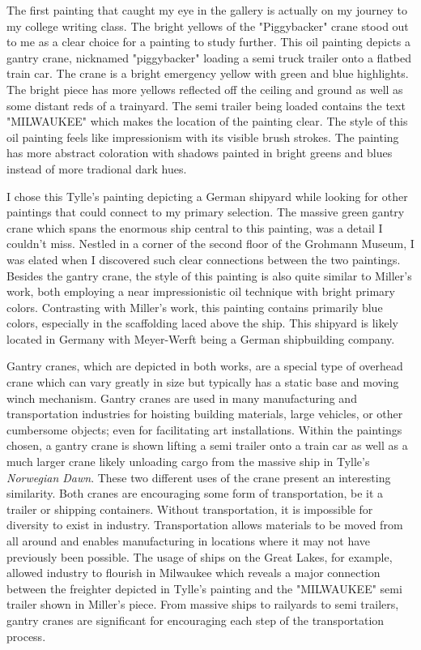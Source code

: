 \documentclass[12pt]{article}
\begin{document}
The first painting that caught my eye in the gallery is actually on my journey to my college writing class. The bright yellows of the 
"Piggybacker" crane stood out to me as a clear choice for a painting to study further.
This oil painting depicts a gantry crane, nicknamed "piggybacker" loading a semi truck trailer onto
a flatbed train car. The crane is a bright emergency yellow with green and blue highlights. The bright piece has more yellows reflected off the ceiling
and ground as well as some distant reds of a trainyard. The semi trailer being loaded contains the text "MILWAUKEE" which makes the location
of the painting clear. The style of this oil painting feels like impressionism with its visible brush strokes. The painting has more abstract coloration 
with shadows painted in bright greens and blues instead of more tradional dark hues.

I chose this Tylle's painting depicting a German shipyard
while looking for other paintings that could connect to my primary selection. The massive green gantry crane which spans the enormous
ship central to this painting, was a detail I couldn't miss. Nestled in a corner of the second floor of the Grohmann Museum, I was elated when I discovered
such clear connections between the two paintings. 
Besides the gantry crane, the style of this painting is also quite similar to Miller's work, both employing a 
near impressionistic oil technique with bright primary colors. Contrasting with Miller's work, this painting contains primarily blue colors, especially in
the scaffolding laced above the ship. This shipyard is likely located in Germany with Meyer-Werft being a German shipbuilding company.

Gantry cranes, which are depicted in both works, are a special type of overhead crane which can vary greatly 
in size but typically has a static base and moving winch mechanism.
Gantry cranes are used in many manufacturing and transportation industries for hoisting building materials, large vehicles, or other cumbersome
objects; even for facilitating art installations. Within the paintings chosen, a gantry crane is shown lifting a semi trailer onto a train car
as well as a much larger crane likely unloading cargo from the massive ship in Tylle's \textit{Norwegian Dawn}. These two different
uses of the crane present an interesting similarity. Both cranes are encouraging some form of transportation, be it a trailer or shipping containers. Without
transportation, it is impossible for diversity to exist in industry. Transportation allows materials to be moved from all around and enables manufacturing in
locations where it may not have previously been possible. The usage of ships on the Great Lakes, for example, allowed industry to flourish in Milwaukee which
reveals a major connection between the freighter depicted in Tylle's painting and the "MILWAUKEE" semi trailer shown in Miller's piece. From massive ships to
railyards to semi trailers, gantry cranes are significant for encouraging each step of the transportation process.
\end{document}
